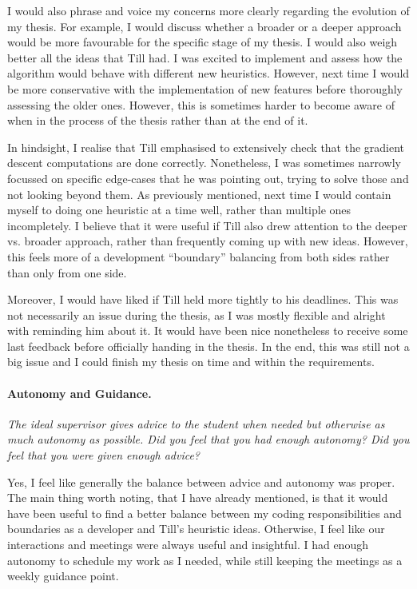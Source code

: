 \documentclass{article}
\begin{document}
I would also phrase and voice my concerns more clearly regarding the evolution of my thesis. For example, I would discuss whether a broader or a deeper approach would be more favourable for the specific stage of my thesis. I would also weigh better all the ideas that Till had. I was excited to implement and assess how the algorithm would behave with different new heuristics. However, next time I would be more conservative with the implementation of new features before thoroughly assessing the older ones. However, this is sometimes harder to become aware of when in the process of the thesis rather than at the end of it.

In hindsight, I realise that Till emphasised to extensively check that the gradient descent computations are done correctly. Nonetheless, I was sometimes narrowly focussed on specific edge-cases that he was pointing out, trying to solve those and not looking beyond them. As previously mentioned, next time I would contain myself to doing one heuristic at a time well, rather than multiple ones incompletely. I believe that it were useful if Till also drew attention to the deeper vs. broader approach, rather than frequently coming up with new ideas. However, this feels more of a development ``boundary'' balancing from both sides rather than only from one side.

Moreover, I would have liked if Till held more tightly to his deadlines. This was not necessarily an issue during the thesis, as I was mostly flexible and alright with reminding him about it. It would have been nice nonetheless to receive some last feedback before officially handing in the thesis. In the end, this was still not a big issue and I could finish my thesis on time and within the requirements.



\paragraph{Autonomy and Guidance.}
\textit{The ideal supervisor gives advice to the student when needed but otherwise as much autonomy as possible.
Did you feel that you had enough autonomy? Did you feel that you were given enough advice?}

Yes, I feel like generally the balance between advice and autonomy was proper. The main thing worth noting, that I have already mentioned, is that it would have been useful to find a better balance between my coding responsibilities and boundaries as a developer and Till's heuristic ideas. Otherwise, I feel like our interactions and meetings were always useful and insightful. I had enough autonomy to schedule my work as I needed, while still keeping the meetings as a weekly guidance point.
\end{document}
